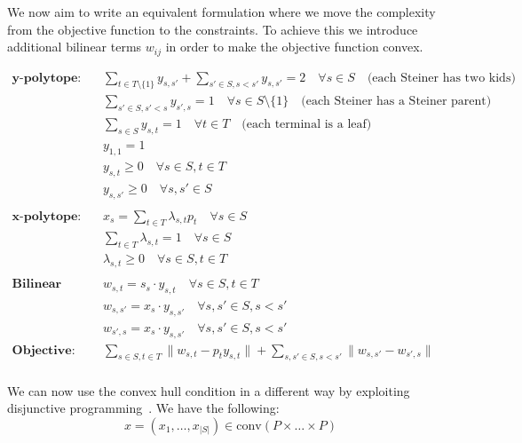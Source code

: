 \documentclass[11pt,reqno,a4paper]{amsart}
\numberwithin{equation}{section}
\theoremstyle{mytheorem}
\theoremstyle{myremark}
\theoremstyle{myparagraph}
\begin{document}
    We now aim to write an equivalent formulation where we move the complexity from the objective function to the constraints.
    To achieve this we introduce additional bilinear terms $w_{ij}$ in order to make the objective function convex.

    \begin{align}
        \textbf{y-polytope:} \quad & \sum_{t \in T \setminus \{1\}} y_{s,s'} + \sum_{s' \in S, s < s'} y_{s,s'} = 2 \quad \forall s \in S \quad \text{(each Steiner has two kids)} \\
        & \sum_{s' \in S, s' < s} y_{s',s} = 1 \quad \forall s \in S \setminus \{1\} \quad \text{(each Steiner has a Steiner parent)} \\
        & \sum_{s \in S} y_{s,t} = 1 \quad \forall t \in T \quad \text{(each terminal is a leaf)} \\
        & y_{1,1} = 1 \\
        & y_{s,t} \geq 0 \quad \forall s \in S, t \in T \\
        & y_{s,s'} \geq 0 \quad \forall s, s' \in S \\
        \\
        \textbf{x-polytope:} \quad & x_s = \sum_{t \in T} \lambda_{s,t} p_t \quad \forall s \in S \\
        & \sum_{t \in T} \lambda_{s,t} = 1 \quad \forall s \in S \\
        & \lambda_{s,t} \geq 0 \quad \forall s \in S, t \in T \\
        \\
        \textbf{Bilinear terms:} \quad & w_{s,t} = s_s \cdot y_{s,t} \quad \forall s \in S, t \in T \\
        & w_{s,s'} = x_s \cdot y_{s,s'} \quad \forall s, s' \in S, s < s' \\
        & w_{s',s} = x_s \cdot y_{s,s'} \quad \forall s, s' \in S, s < s' \\
        \textbf{Objective:} \quad & \sum_{s \in S, t \in T} \| w_{s,t} - p_t y_{s,t} \| + \sum_{s, s' \in S, s < s'} \| w_{s,s'} - w_{s',s} \| \\
    \end{align}

    We can now use the convex hull condition in a different way by exploiting disjunctive programming~\cite[2.11]{Conforti2014}.
    We have the following:
    \begin{equation}
        x = (x_1, \ldots, x_{|S|}) \in \text{conv}(P \times \ldots \times P)
    \end{equation}
\end{document}

